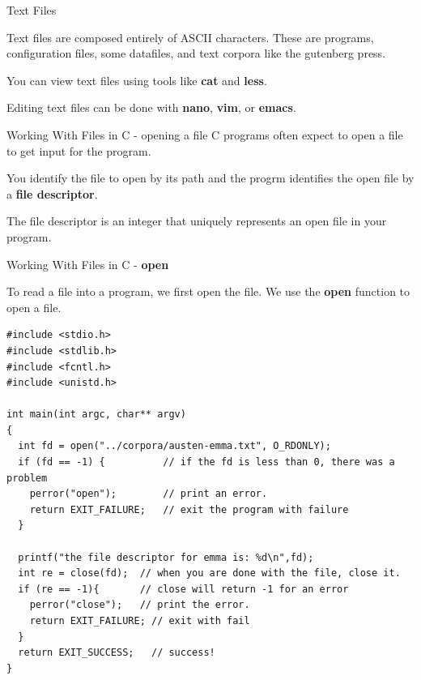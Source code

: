 \documentclass[10pt]{beamer}
\begin{document}
\begin{frame}[fragile]{Text Files}

Text files are composed entirely of ASCII characters.  These are programs, configuration files, some datafiles, and text corpora like the gutenberg press.

You can view text files using tools like \textbf{cat} and \textbf{less}.

Editing text files can be done with \textbf{nano}, \textbf{vim}, or \textbf{emacs}.



\end{frame}
\begin{frame}[fragile]{Working With Files in C - opening a file}
C programs often expect to open a file to get input for the program.  

You identify the file to open by its path and the progrm identifies the open file by a \textbf{file descriptor}.  

The file descriptor is an integer that uniquely represents an open file in your program.

\end{frame}
\begin{frame}[fragile]{Working With Files in C - \textbf{open}}

To read a file into a program, we first open the file.  We use the \textbf{open} function to open a file. 

\fontsize{8pt}{8pt}\selectfont
\begin{verbatim}
#include <stdio.h>
#include <stdlib.h>
#include <fcntl.h>
#include <unistd.h>

int main(int argc, char** argv)
{
  int fd = open("../corpora/austen-emma.txt", O_RDONLY);
  if (fd == -1) {          // if the fd is less than 0, there was a problem
    perror("open");        // print an error.
    return EXIT_FAILURE;   // exit the program with failure
  }

  printf("the file descriptor for emma is: %d\n",fd);
  int re = close(fd);  // when you are done with the file, close it.
  if (re == -1){       // close will return -1 for an error
    perror("close");   // print the error.
    return EXIT_FAILURE; // exit with fail
  }
  return EXIT_SUCCESS;   // success!
}
\end{verbatim}

\end{frame}
\end{document}
